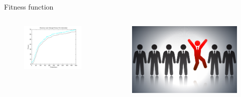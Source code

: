 \documentclass[24pt]{beamer}
\begin{document}
    \begin{frame}{Fitness function}
        \begin{columns}
                \begin{figure}
                \includegraphics[scale=0.4]{fitnessfunction}
                \end{figure}
                \begin{figure}
                \includegraphics[scale=0.04]{best}
                \end{figure}
        \end{columns}
    \end{frame}
\end{document}
